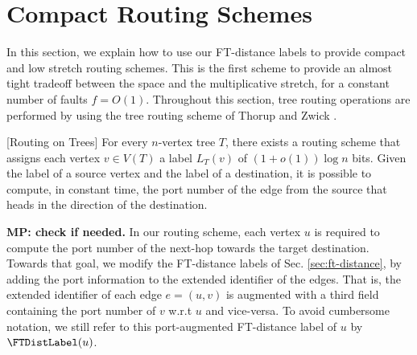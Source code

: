 \section{Compact Routing Schemes}
In this section, we explain how to use our FT-distance labels to provide compact and low stretch routing schemes. This is the first scheme to provide an almost tight tradeoff between the space and the multiplicative stretch, for a constant number of faults $f=O(1)$.  Throughout this section, tree routing operations are performed by using the tree routing scheme of Thorup and Zwick \cite{thorup2001compact}.
\begin{fact}\label{fc:route-trees}[Routing on Trees]\cite{thorup2001compact}
For every $n$-vertex tree $T$, there exists a routing scheme that assigns each vertex $v \in V(T)$ a label $L_T(v)$ of $(1+o(1))\log n$ bits. Given the label of a source vertex
and the label of a destination, it is possible to compute, in constant time, the port number of the edge from the source that heads in the direction of the destination.
\end{fact}

\textbf{MP: check if needed.} 
In our routing scheme, each vertex $u$ is required to compute the port number of the next-hop towards the target destination. Towards that goal, we modify the FT-distance labels of Sec. \ref{sec:ft-distance}, by adding the port information to the extended identifier of the edges. That is, the extended identifier of each edge $e=(u,v)$ is augmented with a third field containing the port number of $v$ w.r.t $u$ and vice-versa. To avoid cumbersome notation, we still refer to this port-augmented FT-distance label of $u$ by $\FTDistLabel(u)$. 

%
%

